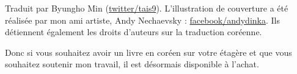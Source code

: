 Traduit par Byungho Min (\href{http://go.yurichev.com/17344}{twitter/tais9}).
L'illustration de couverture a été réalisée par mon ami artiste, Andy Nechaevsky :
\href{http://go.yurichev.com/17023}{facebook/andydinka}.
Ils détiennent également les droits d'auteurs sur la traduction coréenne.

Donc si vous souhaitez avoir un livre  en coréen sur votre étagère et que vous souhaitez soutenir mon travail, il est désormais disponible à l'achat.

